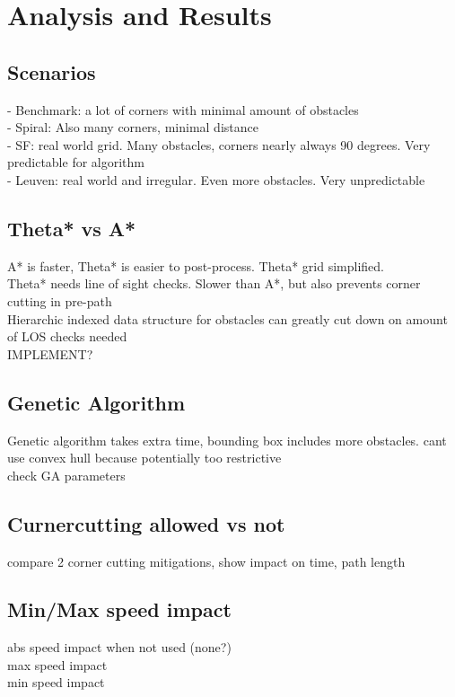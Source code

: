 \section{Analysis and Results}
\label{section:analysis}

\subsection{Scenarios}
- Benchmark: a lot of corners with minimal amount of obstacles\\
- Spiral: Also many corners, minimal distance\\
- SF: real world grid. Many obstacles, corners nearly always 90 degrees. Very predictable for algorithm\\
- Leuven: real world and irregular. Even more obstacles. Very unpredictable\\
\subsection{Theta* vs A*}
A* is faster, Theta* is easier to post-process. Theta* grid simplified.\\
Theta* needs line of sight checks. Slower than A*, but also prevents corner cutting in pre-path\\
Hierarchic indexed data structure for obstacles can greatly cut down on amount of LOS checks needed \\ IMPLEMENT?
\subsection{Genetic Algorithm}
Genetic algorithm takes extra time, bounding box includes more obstacles. cant use convex hull because potentially too restrictive\\
check GA parameters\\
\subsection{Curnercutting allowed vs not}
compare 2 corner cutting mitigations, show impact on time, path length\\
\subsection{Min/Max speed impact}
abs speed impact when not used (none?)\\
max speed impact\\
min speed impact\\
